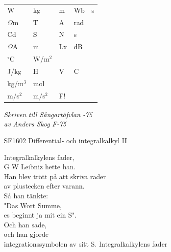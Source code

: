 \documentclass[a6paper,10pt]{article}
\begin{document}
\noindent
{}
\begin{center}
\end{center}
\vspace{-10pt}
\begin{table}[!h]
\begin{tabularx}{0.85\textwidth}{X X X X X}
W&kg&m&Wb&s
\vspace{3pt} \\
$\Omega$m&T&A&rad
\vspace{3pt} \\
Cd&S&N&s
\vspace{3pt} \\
$\Omega$A&m&Lx&dB
\vspace{3pt} \\
$^{\circ}$C&W/m$^2$ &
\vspace{5pt} \\
J/kg&H&V&C
\vspace{3pt} \\
kg/m$^3$ & mol
\vspace{3pt} \\
m/s$^2$&m/s$^2$&F!
\end{tabularx}
\begin{flushright}
\textit{Skriven till Sångartäfvlan -75\\ av Anders Skog F-75}
\end{flushright}
\end{table}
\begin{center}
\footnotesize SF1602 Differential- och integralkalkyl II\\
\end{center}
\small Integralkalkylens fader, \\
G W Leibniz hette han. \\
Han blev trött på att skriva rader \\
av plustecken efter varann. 
\vspace{5pt}\\
Så han tänkte: \\
"Das Wort Summe, \\
es beginnt ja mit ein S". \\
Och han sade, \\
och han gjorde \\
integrationssymbolen av sitt S. 
\newpage
\setlength{\oddsidemargin}{-0.47in}
\noindent
Integralkalkylens fader \\
\end{document}
